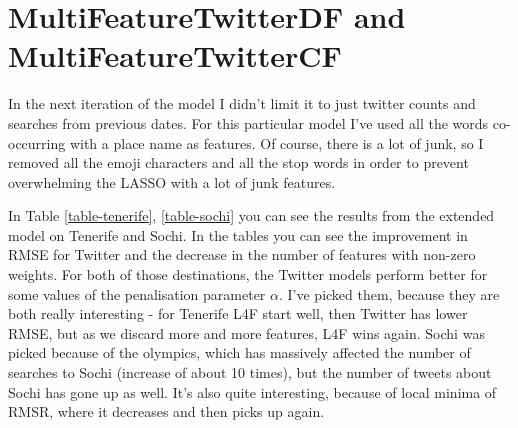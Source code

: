 \documentclass[minf,frontabs,twoside,singlespacing,parskip]{infthesis}
\begin{document}

\newpage
\section{MultiFeatureTwitterDF and MultiFeatureTwitterCF}
\label{sec:features}

In the next iteration of the model I didn't limit it to just twitter counts and searches from previous dates. For this particular model I've used all the words co-occurring with a place name as features. Of course, there is a lot of junk, so I removed all the emoji characters and all the stop words in order to prevent overwhelming the LASSO with a lot of junk features.

In Table \ref{table-tenerife}, \ref{table-sochi} you can see the results from the extended model on Tenerife and Sochi. In the tables you can see the improvement in RMSE for Twitter and the decrease in the number of features with non-zero weights. For both of those destinations, the Twitter models perform better for some values of the penalisation parameter $\alpha$. I've picked them, because they are both really interesting - for Tenerife L4F start well, then Twitter has lower RMSE, but as we discard more and more features, L4F wins again. Sochi was picked because of the olympics, which has massively affected the number of searches to Sochi (increase of about 10 times), but the number of tweets about Sochi has gone up as well. 
It's also quite interesting, because of local minima of RMSR, where it decreases and then picks up again.
\end{document}

